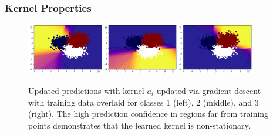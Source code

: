 


\begin{frame}
 \frametitle{Kernel Properties}
\begin{figure}[!ht]
    \centering
\includegraphics[width=0.3\textwidth]{c4_figures/svm1.png}\includegraphics[width=0.3\textwidth]{c4_figures/svm2.png}\includegraphics[width=0.3\textwidth]{c4_figures/svm3.png}
    \caption{Updated predictions with kernel $a_i$ updated via gradient descent with training data overlaid for classes 1 (left), 2 (middle), and 3 (right). The high prediction confidence in regions far from training points demonstrates that the learned kernel is non-stationary.}
    \label{fig:svm}
  \end{figure}
\end{frame}

